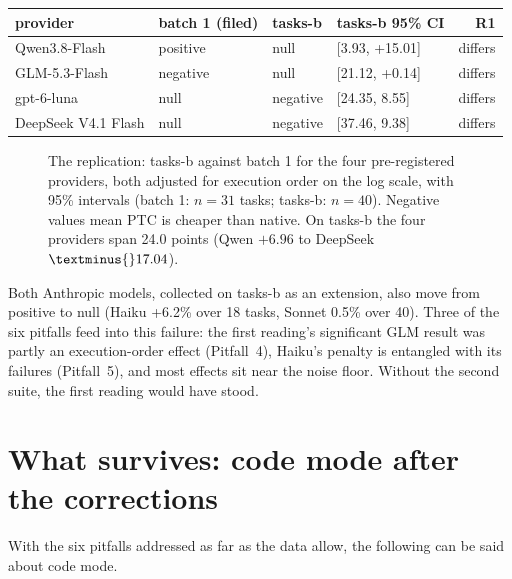 \documentclass[10pt]{article}
\newcommand*{\mi}{\textminus}   %
\newenvironment{inlinetable}{\par\medskip\noindent\begin{minipage}{\linewidth}\centering\small}{\end{minipage}\par\bigskip}
\begin{document}
\begin{inlinetable}
\label{tab:r1}
\begin{tabular}{@{}llllr@{}}
\toprule
provider & batch 1 (filed) & tasks-b & tasks-b 95\% CI & R1 \\
\midrule
Qwen3.8-Flash & positive & null & [\mi{}3.93, +15.01] & differs \\
GLM-5.3-Flash & negative & null & [\mi{}21.12, +0.14] & differs \\
gpt-6-luna & null & negative & [\mi{}24.35, \mi{}8.55] & differs \\
DeepSeek V4.1 Flash & null & negative & [\mi{}37.46, \mi{}9.38] & differs \\
\bottomrule
\end{tabular}
\end{inlinetable}

\begin{figure}[htbp]\centering
\caption{The replication: tasks-b against batch 1 for the four pre-registered providers, both adjusted
for execution order on the log scale, with 95\% intervals (batch 1: $n = 31$ tasks; tasks-b: $n = 40$).
Negative values mean PTC is cheaper than native. On tasks-b the four providers span 24.0 points
(Qwen $+6.96$ to DeepSeek $\mi{}17.04$).}\label{fig:replication}\end{figure}

Both Anthropic models, collected on tasks-b as an extension, also move from positive to null (Haiku
+6.2\% over 18 tasks, Sonnet \mi{}0.5\% over 40). Three of the six pitfalls feed into this failure:
the first reading's significant GLM result was partly an execution-order effect (Pitfall~4), Haiku's
penalty is entangled with its failures (Pitfall~5), and most effects sit near the noise floor.
Without the second suite, the first reading would have stood.

\section{What survives: code mode after the corrections}\label{sec:survives}

With the six pitfalls addressed as far as the data allow, the following can be said about code mode.
\end{document}
